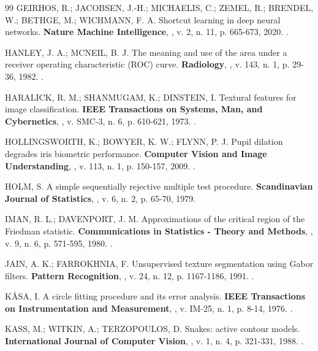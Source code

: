 \begin{thebibliography}{99}
GEIRHOS, R.; JACOBSEN, J.-H.; MICHAELIS, C.; ZEMEL, R.; BRENDEL, W.;
BETHGE, M.; WICHMANN, F. A. Shortcut learning in deep neural networks.
\textbf{Nature Machine Intelligence}, \semlocal, v. 2, n. 11, p. 665-673,
2020. .

HANLEY, J. A.; MCNEIL, B. J. The meaning and use of the area under a receiver
operating characteristic (ROC) curve. \textbf{Radiology}, \semlocal, v. 143,
n. 1, p. 29-36, 1982. .

HARALICK, R. M.; SHANMUGAM, K.; DINSTEIN, I. Textural features for image
classification. \textbf{IEEE Transactions on Systems, Man, and Cybernetics},
\semlocal, v. SMC-3, n. 6, p. 610-621, 1973. .

HOLLINGSWORTH, K.; BOWYER, K. W.; FLYNN, P. J. Pupil dilation degrades iris
biometric performance. \textbf{Computer Vision and Image Understanding},
\semlocal, v. 113, n. 1, p. 150-157, 2009. .

HOLM, S. A simple sequentially rejective multiple test procedure.
\textbf{Scandinavian Journal of Statistics}, \semlocal, v. 6, n. 2,
p. 65-70, 1979.

IMAN, R. L.; DAVENPORT, J. M. Approximations of the critical region of the
Friedman statistic. \textbf{Communications in Statistics - Theory and
Methods}, \semlocal, v. 9, n. 6, p. 571-595, 1980.
.

JAIN, A. K.; FARROKHNIA, F. Unsupervised texture segmentation using Gabor
filters. \textbf{Pattern Recognition}, \semlocal, v. 24, n. 12,
p. 1167-1186, 1991. .

KÅSA, I. A circle fitting procedure and its error analysis. \textbf{IEEE
Transactions on Instrumentation and Measurement}, \semlocal, v. IM-25, n. 1,
p. 8-14, 1976. .

KASS, M.; WITKIN, A.; TERZOPOULOS, D. Snakes: active contour models.
\textbf{International Journal of Computer Vision}, \semlocal, v. 1, n. 4,
p. 321-331, 1988. .


\end{thebibliography}
